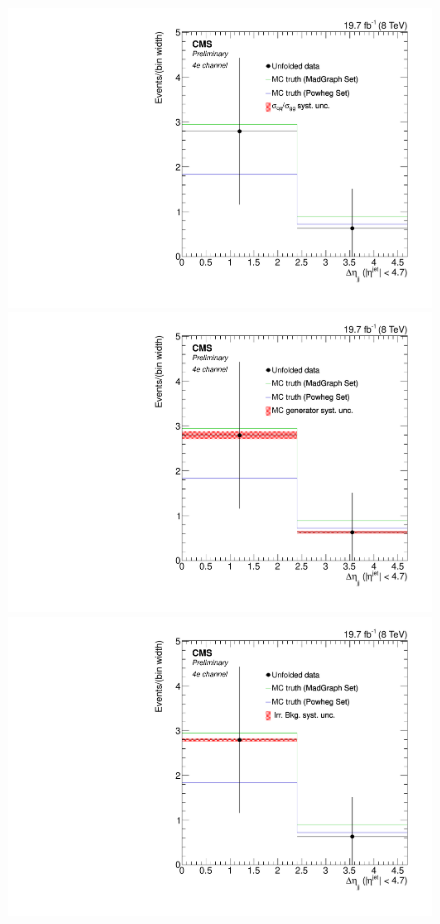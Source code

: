 \clearpage
\begin{figure}[hbtp]
 \begin{center}
   \includegraphics[width=0.8\cmsFigWidth]{Figures/Unfolding/Systematics/ZZTo4e_Deta_qqgg_Mad_fr}     
   \includegraphics[width=0.8\cmsFigWidth]{Figures/Unfolding/Systematics/ZZTo4e_Deta_MCgen_Mad_fr}     
   \includegraphics[width=0.8\cmsFigWidth]{Figures/Unfolding/Systematics/ZZTo4e_Deta_IrrBkg_Mad_fr}

\end{center}
\end{figure}
